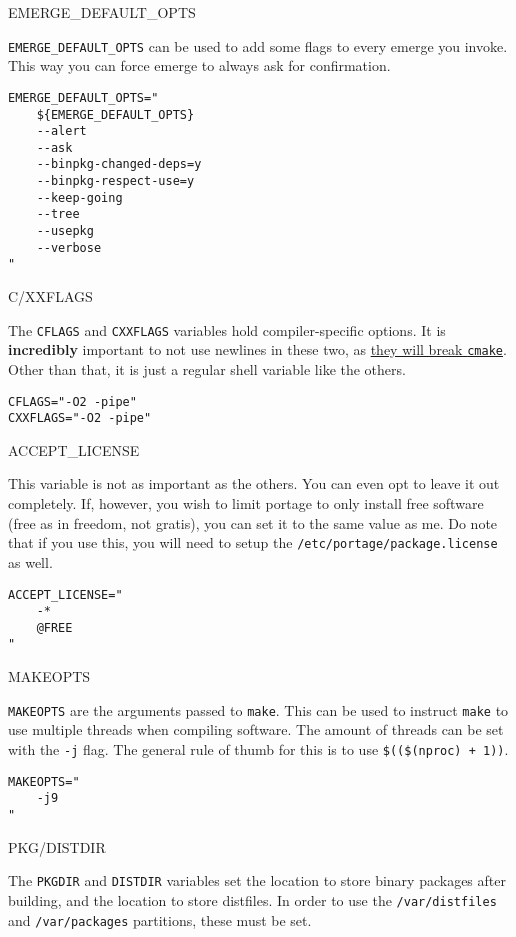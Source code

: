 EMERGE\_DEFAULT\_OPTS

\texttt{EMERGE\_DEFAULT\_OPTS} can be used to add some flags to every
emerge you invoke. This way you can force emerge to always ask for
confirmation.

\begin{verbatim}
EMERGE_DEFAULT_OPTS="
    ${EMERGE_DEFAULT_OPTS}
    --alert
    --ask
    --binpkg-changed-deps=y
    --binpkg-respect-use=y
    --keep-going
    --tree
    --usepkg
    --verbose
"
\end{verbatim}

C/XXFLAGS

The \texttt{CFLAGS} and \texttt{CXXFLAGS} variables hold
compiler-specific options. It is \textbf{incredibly} important to not
use newlines in these two, as
\href{https://bugs.gentoo.org/show_bug.cgi?id=500034\#c6}{they will
break \texttt{cmake}}. Other than that, it is just a regular shell
variable like the others.

\begin{verbatim}
CFLAGS="-O2 -pipe"
CXXFLAGS="-O2 -pipe"
\end{verbatim}

ACCEPT\_LICENSE

This variable is not as important as the others. You can even opt to
leave it out completely. If, however, you wish to limit portage to only
install free software (free as in freedom, not gratis), you can set it
to the same value as me. Do note that if you use this, you will need to
setup the \texttt{/etc/portage/package.license} as well.

\begin{verbatim}
ACCEPT_LICENSE="
    -*
    @FREE
"
\end{verbatim}

MAKEOPTS

\texttt{MAKEOPTS} are the arguments passed to \texttt{make}. This can be
used to instruct \texttt{make} to use multiple threads when compiling
software. The amount of threads can be set with the \texttt{-j} flag.
The general rule of thumb for this is to use
\texttt{\$((\$(nproc)\ +\ 1))}.

\begin{verbatim}
MAKEOPTS="
    -j9
"
\end{verbatim}

PKG/DISTDIR

The \texttt{PKGDIR} and \texttt{DISTDIR} variables set the location to
store binary packages after building, and the location to store
distfiles. In order to use the \texttt{/var/distfiles} and
\texttt{/var/packages} partitions, these must be set.

